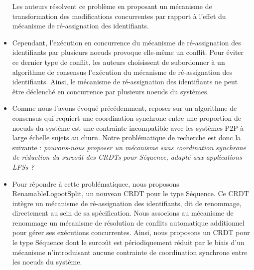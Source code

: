 \begin{itemize}
        Les auteurs résolvent ce problème en proposant un mécanisme de transformation des modifications concurrentes par rapport à l'effet du mécanisme de ré-assignation des identifiants.
    \item Cependant, l'exécution en concurrence du mécanisme de ré-assignation des identifiants par plusieurs noeuds provoque elle-même un conflit.
        Pour éviter ce dernier type de conflit, les auteurs choisissent de subordonner à un algorithme de consensus l'exécution du mécanisme de ré-assignation des identifiants.
        Ainsi, le mécanisme de ré-assignation des identifiants ne peut être déclenché en concurrence par plusieurs noeuds du systèmes.
    \item Comme nous l'avons évoqué précédemment, reposer sur un algorithme de consensus qui requiert une coordination synchrone entre une proportion de noeuds du système est une contrainte incompatible avec les systèmes \ac{P2P} à large échelle sujets au churn.
        Notre problématique de recherche est donc la suivante : \emph{pouvons-nous proposer un mécanisme sans coordination synchrone de réduction du surcoût des \acp{CRDT} pour Séquence, \ie adapté aux applications \acp{LFS} ?}
    \item Pour répondre à cette problématiquee, nous proposons RenamableLogootSplit, un nouveau \ac{CRDT} pour le type Séquence.
        Ce \ac{CRDT} intègre un mécanisme de ré-assignation des identifiants, dit de renommage, directement au sein de sa spécification.
        Nous associons au mécanisme de renommage un mécanisme de résolution de conflits automatique additionnel pour gérer ses exécutions concurrentes.
        Ainsi, nous proposons un \ac{CRDT} pour le type Séquence dont le surcoût est périodiquement réduit par le biais d'un mécanisme n'introduisant aucune contrainte de coordination synchrone entre les noeuds du système.
\end{itemize}

